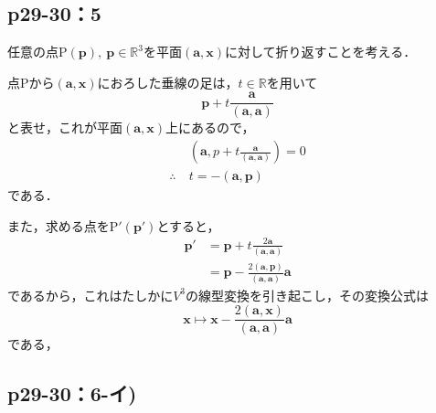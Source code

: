 \documentclass[uplatex,dvipdfmx,a4paper,11pt,fleqn]{jsarticle}
\begin{document}
\subsection*{p29-30：5}

\begin{tleftbar}
    任意の点$\mathrm{P}(\bm{p}),~\bm{p} \in \mathbb{R}^3$を平面$(\bm{a},\bm{x})$に対して折り返すことを考える．

    点$\mathrm{P}$から$(\bm{a},\bm{x})$におろした垂線の足は，$t \in \mathbb{R}$を用いて
    \[
        \bm{p} + t \frac{\bm{a}}{(\bm{a},\bm{a})}
    \]
    と表せ，これが平面$(\bm{a},\bm{x})$上にあるので，
    \begin{align*} 
        & (\bm{a},p+t\frac{\bm{a}}{(\bm{a},\bm{a})})=0 \\
        \therefore ~ & t=- (\bm{a},\bm{p}) 
    \end{align*} 
    である．
    
    また，求める点を$\mathrm{P}' (\bm{p}')$とすると，
    \begin{align*}
        \bm{p}' &= \bm{p}+t \frac{2\bm{a}}{(\bm{a},\bm{a})} \\
        & = \bm{p}-\frac{2(\bm{a},\bm{p})}{(\bm{a},\bm{a})} \bm{a}
    \end{align*}
    であるから，これはたしかに$V^3$の線型変換を引き起こし，その変換公式は
    \[
        \bm{x} \mapsto \bm{x}-\frac{2(\bm{a},\bm{x})}{(\bm{a},\bm{a})} \bm{a}
    \]
    である，
\end{tleftbar}

\newpage 

\subsection*{p29-30：6-イ)}
\end{document}
